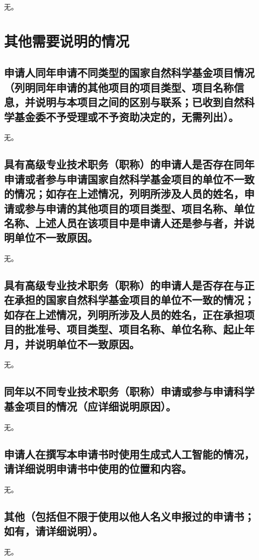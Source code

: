 \documentclass{nsfc}
\begin{document}
无。

\chapter{其他需要说明的情况}

\section{申请人同年申请不同类型的国家自然科学基金项目情况（列明同年申请的其他项目的项目类型、项目名称信息，并说明与本项目之间的区别与联系；已收到自然科学基金委不予受理或不予资助决定的，无需列出）。}

无。

\section{具有高级专业技术职务（职称）的申请人是否存在同年申请或者参与申请国家自然科学基金项目的单位不一致的情况；如存在上述情况，列明所涉及人员的姓名，申请或参与申请的其他项目的项目类型、项目名称、单位名称、上述人员在该项目中是申请人还是参与者，并说明单位不一致原因。}

无。

\section{具有高级专业技术职务（职称）的申请人是否存在与正在承担的国家自然科学基金项目的单位不一致的情况；如存在上述情况，列明所涉及人员的姓名，正在承担项目的批准号、项目类型、项目名称、单位名称、起止年月，并说明单位不一致原因。}

无。

\section{同年以不同专业技术职务（职称）申请或参与申请科学基金项目的情况（应详细说明原因）。}

无。

\section{申请人在撰写本申请书时使用生成式人工智能的情况，请详细说明申请书中使用的位置和内容。}

无。

\section{其他（包括但不限于使用以他人名义申报过的申请书；如有，请详细说明）。}

无。
\end{document}
